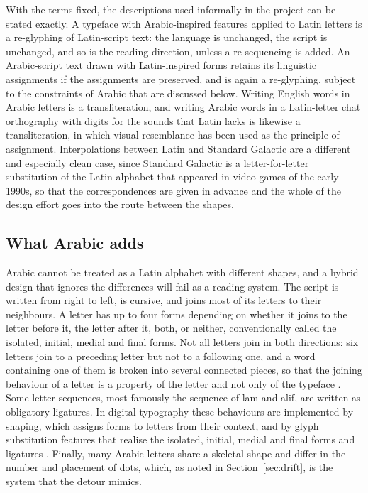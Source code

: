 With the terms fixed, the descriptions used informally in the project can be stated exactly. A typeface with Arabic-inspired features applied to Latin letters is a re-glyphing of Latin-script text: the language is unchanged, the script is unchanged, and so is the reading direction, unless a re-sequencing is added. An Arabic-script text drawn with Latin-inspired forms retains its linguistic assignments if the assignments are preserved, and is again a re-glyphing, subject to the constraints of Arabic that are discussed below. Writing English words in Arabic letters is a transliteration, and writing Arabic words in a Latin-letter chat orthography with digits for the sounds that Latin lacks is likewise a transliteration, in which visual resemblance has been used as the principle of assignment. Interpolations between Latin and Standard Galactic are a different and especially clean case, since Standard Galactic is a letter-for-letter substitution of the Latin alphabet that appeared in video games of the early 1990s, so that the correspondences are given in advance and the whole of the design effort goes into the route between the shapes.

\subsection{What Arabic adds}

Arabic cannot be treated as a Latin alphabet with different shapes, and a hybrid design that ignores the differences will fail as a reading system. The script is written from right to left, is cursive, and joins most of its letters to their neighbours. A letter has up to four forms depending on whether it joins to the letter before it, the letter after it, both, or neither, conventionally called the isolated, initial, medial and final forms. Not all letters join in both directions: six letters join to a preceding letter but not to a following one, and a word containing one of them is broken into several connected pieces, so that the joining behaviour of a letter is a property of the letter and not only of the typeface \citep{unicode}. Some letter sequences, most famously the sequence of lam and alif, are written as obligatory ligatures. In digital typography these behaviours are implemented by shaping, which assigns forms to letters from their context, and by glyph substitution features that realise the isolated, initial, medial and final forms and ligatures \citep{opentype}. Finally, many Arabic letters share a skeletal shape and differ in the number and placement of dots, which, as noted in Section~\ref{sec:drift}, is the system that the detour mimics.

